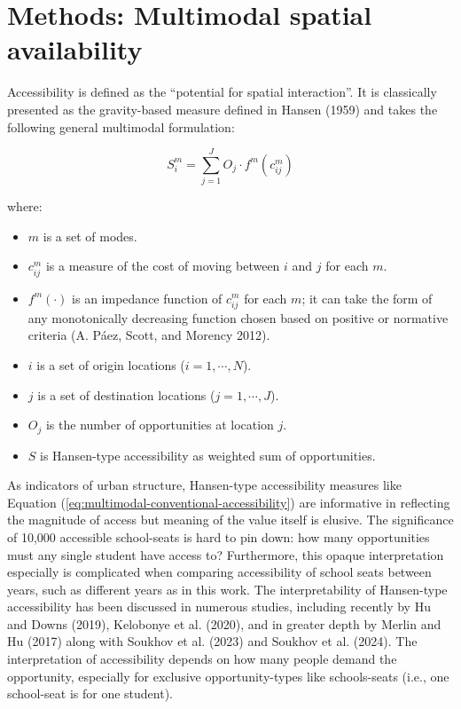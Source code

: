 \documentclass[
default
]{sn-jnl}
\providecommand{\tightlist}{%
  \setlength{\itemsep}{0pt}\setlength{\parskip}{0pt}}\usepackage{longtable,booktabs,array}
\begin{document}
\section{Methods: Multimodal spatial
availability}\label{methods-multimodal-spatial-availability}

Accessibility is defined as the ``potential for spatial interaction''.
It is classically presented as the gravity-based measure defined in
Hansen (1959) and takes the following general multimodal formulation:

\begin{equation}
\label{eq:multimodal-conventional-accessibility}
S_i^m = \sum_{j=1}^JO_j \cdot f^m(c_{ij}^m)
\end{equation}

\noindent where:

\begin{itemize}
\tightlist
\item
  \(m\) is a set of modes.
\item
  \(c_{ij}^m\) is a measure of the cost of moving between \(i\) and
  \(j\) for each \(m\).
\item
  \(f^m(\cdot)\) is an impedance function of \(c_{ij}^m\) for each
  \(m\); it can take the form of any monotonically decreasing function
  chosen based on positive or normative criteria (A. Páez, Scott, and
  Morency 2012).
\item
  \(i\) is a set of origin locations (\(i = 1,\cdots,N\)).
\item
  \(j\) is a set of destination locations (\(j = 1,\cdots,J\)).
\item
  \(O_j\) is the number of opportunities at location \(j\).
\item
  \(S\) is Hansen-type accessibility as weighted sum of opportunities.
\end{itemize}

As indicators of urban structure, Hansen-type accessibility measures
like Equation (\ref{eq:multimodal-conventional-accessibility}) are
informative in reflecting the magnitude of access but meaning of the
value itself is elusive. The significance of 10,000 accessible
school-seats is hard to pin down: how many opportunities must any single
student have access to? Furthermore, this opaque interpretation
especially is complicated when comparing accessibility of school seats
between years, such as different years as in this work. The
interpretability of Hansen-type accessibility has been discussed in
numerous studies, including recently by Hu and Downs (2019), Kelobonye
et al. (2020), and in greater depth by Merlin and Hu (2017) along with
Soukhov et al. (2023) and Soukhov et al. (2024). The interpretation of
accessibility depends on how many people demand the opportunity,
especially for exclusive opportunity-types like schools-seats (i.e., one
school-seat is for one student).
\end{document}
